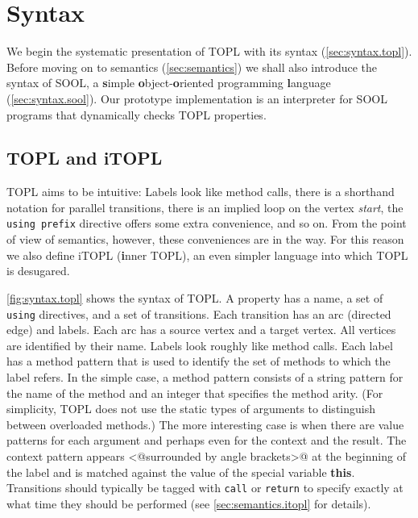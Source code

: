 \documentclass[preprint]{sigplanconf} %
\theoremstyle{definition}
\theoremstyle{remark}
\begin{document}
\section{Syntax}\label{sec:syntax} %

We begin the systematic presentation of TOPL with its syntax (\autoref{sec:syntax.topl}).
Before moving on to semantics (\autoref{sec:semantics}) we shall also introduce the syntax of SOOL, a \textbf simple \textbf object-\textbf oriented programming \textbf language (\autoref{sec:syntax.sool}).
Our prototype implementation is an interpreter for SOOL programs that dynamically checks TOPL properties.

\subsection{TOPL and iTOPL}\label{sec:syntax.topl} %


TOPL aims to be intuitive:
Labels look like method calls, there is a shorthand notation for parallel transitions, there is an implied loop on the vertex \textit{start}, the \texttt{using prefix} directive offers some extra convenience, and so on.
From the point of view of semantics, however, these conveniences are in the way.
For this reason we also define iTOPL (\textbf inner TOPL), an even simpler language into which TOPL is desugared.

\autoref{fig:syntax.topl} shows the syntax of TOPL\null.
A property has a name, a set of \texttt{using} directives, and a set of transitions.
Each transition has an arc (directed edge) and labels.
Each arc has a source vertex and a target vertex.
All vertices are identified by their name.
Labels look roughly like method calls.
Each label has a method pattern that is used to identify the set of methods to which the label refers.
In the simple case, a method pattern consists of a string pattern for the name of the method and an integer that specifies the method arity.
(For simplicity, TOPL does not use the static types of arguments to distinguish between overloaded methods.)
The more interesting case is when there are value patterns for each argument and perhaps even for the context and the result.
The context pattern appears \Verb@<@surrounded by angle brackets\Verb@>@ at the beginning of the label and is matched against the value of the special variable \textbf{this}.
Transitions should typically be tagged with \texttt{call} or \texttt{return} to specify exactly at what time they should be performed (see \autoref{sec:semantics.itopl} for details).
\end{document}
